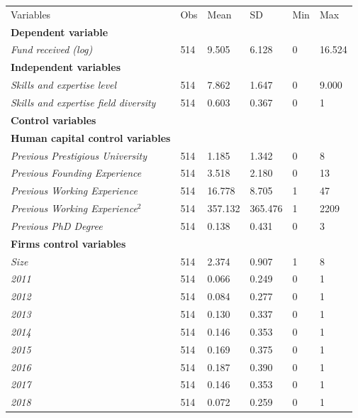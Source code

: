 \documentclass[12pt]{article}
\begin{document}
\begin{table} [ht]
\scriptsize
\renewcommand{\arraystretch}{1.5}
\begin{tabularx}{\textwidth}{ p{4.9cm} p{1.6cm} p{1.6cm} p{1.6cm} p{1.6cm} p{1.6cm} }
\toprule
\multicolumn{1}{l}{Variables}&\multicolumn{1}{l}{Obs}&\multicolumn{1}{l}{Mean}&\multicolumn{1}{l}{SD}&\multicolumn{1}{l}{Min}&\multicolumn{1}{l}{Max} \\
\cmidrule(r){1-6}
\textbf{Dependent variable} & & & & & \\
\textit{Fund received (log)} & 514 & 9.505 & 6.128 & 0 & 16.524 \\
\cmidrule(r){1-6}
\textbf{Independent variables} & & & & & \\
\textit{Skills and expertise level} & 514 & 7.862 & 1.647 & 0 & 9.000 \\
\textit{Skills and expertise field diversity} & 514 & 0.603 & 0.367 & 0 & 1 \\
\cmidrule(r){1-6}\textbf{Control variables} & & & & & \\
\textbf{Human capital control variables} & & & & & \\
\textit{Previous Prestigious University} & 514 & 1.185 & 1.342 & 0 & 8 \\
\textit{Previous Founding Experience} & 514 & 3.518 & 2.180 & 0 & 13 \\
\textit{Previous Working Experience} & 514 & 16.778 & 8.705 & 1 & 47 \\
\textit{Previous Working Experience$^2$} & 514 & 357.132 & 365.476 & 1 & 2209 \\
\textit{Previous PhD Degree} & 514 & 0.138 & 0.431 & 0 & 3 \\
\cmidrule(r){1-6}
\textbf{Firms control variables} & & & & & \\
\textit{Size} & 514 & 2.374 & 0.907 & 1 & 8 \\
\textit{2011} & 514 & 0.066 & 0.249 & 0 & 1 \\
\textit{2012} & 514 & 0.084 & 0.277 & 0 & 1 \\
\textit{2013} & 514 & 0.130 & 0.337 & 0 & 1 \\
\textit{2014} & 514 & 0.146 & 0.353 & 0 & 1 \\
\textit{2015} & 514 & 0.169 & 0.375 & 0 & 1 \\
\textit{2016} & 514 & 0.187 & 0.390 & 0 & 1 \\
\textit{2017} & 514 & 0.146 & 0.353 & 0 & 1 \\
\textit{2018} & 514 & 0.072 & 0.259 & 0 & 1 \\

\end{tabularx}
\end{table}
\end{document}
